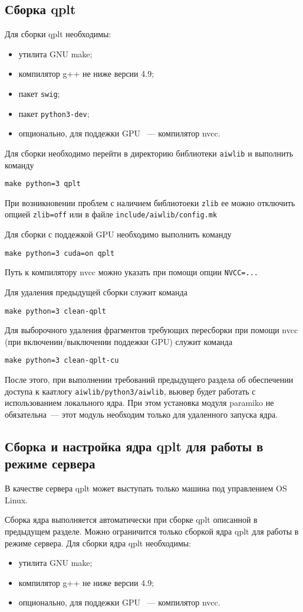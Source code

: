 \documentclass[12pt]{article}
\begin{document}
\subsection{Сборка qplt}
Для сборки qplt необходимы:
\begin{itemize}
\item утилита GNU make;
\item компилятор g++ не ниже версии 4.9;
\item пакет \verb'swig';
\item пакет \verb'python3-dev';
\item опционально, для поддежки GPU ~--- компилятор nvcc.
\end{itemize}
Для сборки необходимо перейти в директорию библиотеки \verb'aiwlib' и выполнить команду
\begin{verbatim}
make python=3 qplt
\end{verbatim}
При возникновении проблем с наличием библиотоеки \verb'zlib' ее можно отключить опцией \verb'zlib=off'
или в файле \verb'include/aiwlib/config.mk'

Для сборки с поддежкой GPU необходимо выполнить команду
\begin{verbatim}
make python=3 cuda=on qplt
\end{verbatim}
Путь к компилятору nvcc можно указать при помощи опции \verb'NVCC=...'

Для удаления предыдущей сборки служит команда
\begin{verbatim}
make python=3 clean-qplt
\end{verbatim}
Для выборочного удаления фрагментов требующих пересборки при помощи nvcc (при включении/выключении поддежки GPU) служит команда
\begin{verbatim}
make python=3 clean-qplt-cu
\end{verbatim}

После этого, при выполнении требований предыдущего раздела об обеспечении доступа к каатлогу \verb'aiwlib/python3/aiwlib',
вьювер будет работать с использованием локального ядра. При этом установка модуля paramiko не обязательна~--- этот модуль необходим только для удаленного запуска ядра. 


\subsection{Сборка и настройка ядра qplt для работы в режиме сервера}
В качестве сервера qplt может выступать только машина под управлением OS Linux.

Сборка ядра выполняется автоматически при сборке qplt описанной в предыдущем разделе.
Можно ограничится только сборкой ядра qplt для работы в режиме сервера.
Для сборки ядра qplt необходимы:
\begin{itemize}
\item утилита GNU make;
\item компилятор g++ не ниже версии 4.9;
\item опционально, для поддежки GPU ~--- компилятор nvcc.
\end{itemize}
\end{document}

